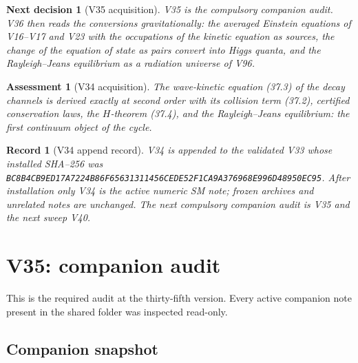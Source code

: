\documentclass[11pt]{article}
\newtheorem{decision}[theorem]{Next decision}
\newtheorem{assessment}[theorem]{Assessment}
\newtheorem{record}[theorem]{Record}
\theoremstyle{remark}
\begin{document}
\begin{decision}[V35 acquisition]
\label{dec:v20v34-next}
V35 is the compulsory companion audit.  V36 then reads the
conversions gravitationally: the averaged Einstein equations of
V16--V17 and V23 with the occupations of the kinetic equation as
sources, the change of the equation of state as pairs convert into
Higgs quanta, and the Rayleigh--Jeans equilibrium as a radiation
universe of V96.
\end{decision}

\begin{assessment}[V34 acquisition]
\label{ass:v20v34}
The wave-kinetic equation (37.3) of the decay channels is derived
exactly at second order with its collision term (37.2), certified
conservation laws, the \(H\)-theorem (37.4), and the Rayleigh--Jeans
equilibrium: the first continuum object of the cycle.
\end{assessment}

\begin{record}[V34 append record]
\label{rec:v20v34}
V34 is appended to the validated V33 whose installed SHA--256 was
\texttt{BC8B4CB9ED17A7224B86F65631311456CEDE52F1CA9A376968E996D48950EC95}.
After installation only V34 is the active numeric SM note; frozen
archives and unrelated notes are unchanged.  The next compulsory
companion audit is V35 and the next sweep V40.
\end{record}


\section{V35: companion audit}
\label{sec:v20v35}

This is the required audit at the thirty-fifth version.  Every
active companion note present in the shared folder was inspected
read-only.

\subsection{Companion snapshot}
\end{document}
